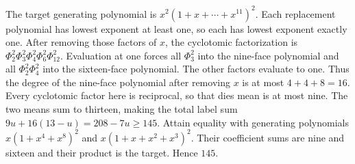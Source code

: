 The target generating polynomial is $x^2(1+x+\cdots+x^{11})^2$. Each replacement polynomial has lowest exponent at least one, so each has lowest exponent exactly one. After removing those factors of $x$, the cyclotomic factorization is $\Phi_2^2\Phi_3^2\Phi_4^2\Phi_6^2\Phi_{12}^2$. Evaluation at one forces all $\Phi_3^2$ into the nine-face polynomial and all $\Phi_2^2\Phi_4^2$ into the sixteen-face polynomial. The other factors evaluate to one. Thus the degree of the nine-face polynomial after removing $x$ is at most $4+4+8=16$. Every cyclotomic factor here is reciprocal, so that die\textquotesingle s mean is at most nine. The two means sum to thirteen, making the total label sum $9u+16(13-u)=208-7u\ge145$. Attain equality with generating polynomials $x(1+x^4+x^8)^2$ and $x(1+x+x^2+x^3)^2$. Their coefficient sums are nine and sixteen and their product is the target. Hence $\boxed{145}$.
